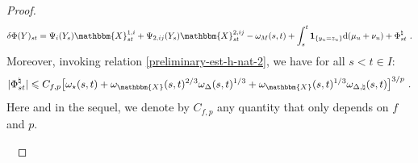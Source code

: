 \documentclass[11pt,reqno,oneside]{amsart}
\numberwithin{equation}{section}
\newcommand{\mathd}{\mathrm{d}}
\begin{document}
\begin{proof}
\begin{equation}\label{eq:phi-y}
\delta \Phi (Y)_{st} = \Psi_i (Y_s) \mathbbm{X}^{1,i}_{st} + \Psi_{2,ij} (Y_s) \mathbbm{X}^{2,ij}_{st} - \omega_M (s, t) + \int_s^t \mathbf{1}_{\{y_u = z_u\}}\mathd (\mu_u + \nu_u)+\Phi^{\natural}_{st} \ .
\end{equation}
Moreover, invoking relation \eqref{preliminary-est-h-nat-2},  we have for all $s<t\in I$:
	\begin{equation}\label{boun-phi-nat}
 | \Phi^{\natural}_{s t} | \leqslant C_{f,p}  \big[ \omega_{\star} (s, t)+\omega_{\mathbbm{X}} (s, t)^{2 / 3} \omega_{\Delta} (s, t)^{1/3} + \omega_{\mathbbm{X}} (s, t)^{1 / 3} \omega_{\Delta,
     \natural} (s, t)\big]^{3 / p}\ . 
		\end{equation}
Here and in the sequel, we denote by $C_{f,p}$ any quantity that only depends on $f$ and $p$.		
  
 	\
  

\end{proof}
\end{document}

